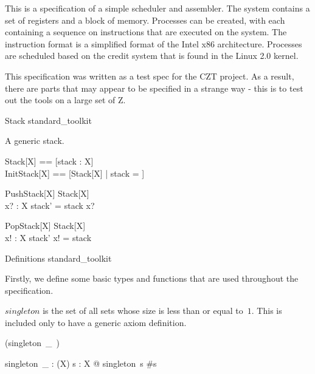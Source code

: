 \documentclass{article}
\begin{document}
This is a specification of a simple scheduler and assembler. The
system contains a set of registers and a block of memory. Processes
can be created, with each containing a sequence on instructions that
are executed on the system. The instruction format is a simplified
format of the Intel x86 architecture. Processes are scheduled based on
the credit system that is found in the Linux 2.0 kernel.

This specification was written as a test spec for the CZT project. As
a result, there are parts that may appear to be specified in a strange
way - this is to test out the tools on a large set of Z.

\begin{zsection}
  \SECTION Stack \parents standard\_toolkit
\end{zsection}

A generic stack.

\begin{zed}
  Stack[X] == [stack : \seq X]\\
  InitStack[X] == [Stack[X] | stack = \emptyset]
\end{zed}

\begin{schema}{PushStack}[X]
  \Delta Stack[X]\\
  x? : X
\where
  stack' = stack \cat \langle x? \rangle
\end{schema}

\begin{schema}{PopStack}[X]
  \Delta Stack[X]\\
  x! : X
\where
  stack' \cat \langle x! \rangle = stack
\end{schema}


\begin{zsection}
  \SECTION Definitions \parents standard\_toolkit
\end{zsection}

Firstly, we define some basic types and functions that are used
throughout the specification.

$singleton$ is the set of all sets whose size is less than or equal to~$1$.
This is included only to have a generic axiom definition.

\begin{zed}
  \relation (singleton~\_~)
\end{zed}

\begin{gendef}[X]
  singleton~\_ : \power (\power X)
\where
  \forall s : \power X @ singleton~s \iff \#s 
\end{gendef}
\end{document}

